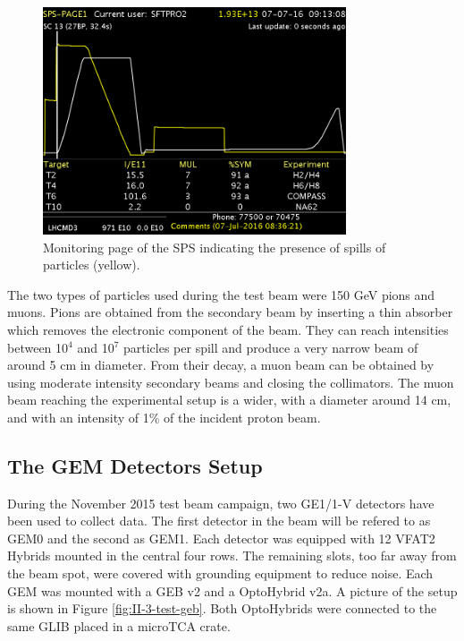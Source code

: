     \begin{figure}[h!]
      \centering
      \includegraphics[width=0.8\textwidth]{img/II-3-test-beam/sps.png}
      \caption{Monitoring page of the SPS indicating the presence of spills of particles (yellow).}
      \label{fig:II-3-sps}
    \end{figure}

    The two types of particles used during the test beam were 150 GeV pions and muons. Pions are obtained from the secondary beam by inserting a thin absorber which removes the electronic component of the beam. They can reach intensities between 10$^4$ and 10$^7$ particles per spill and produce a very narrow beam of around 5 cm in diameter. From their decay, a muon beam can be obtained by using moderate intensity secondary beams and closing the collimators. The muon beam reaching the experimental setup is a wider, with a diameter around 14 cm, and with an intensity of 1\% of the incident proton beam.

    \subsection{The GEM Detectors Setup}

      During the November 2015 test beam campaign, two GE1/1-V detectors have been used to collect data. The first detector in the beam will be refered to as GEM0 and the second as GEM1. Each detector was equipped with 12 VFAT2 Hybrids mounted in the central four rows. The remaining slots, too far away from the beam spot, were covered with grounding equipment to reduce noise. Each GEM was mounted with a GEB v2 and a OptoHybrid v2a. A picture of the setup is shown in Figure \ref{fig:II-3-test-geb}. Both OptoHybrids were connected to the same GLIB placed in a microTCA crate. \\

